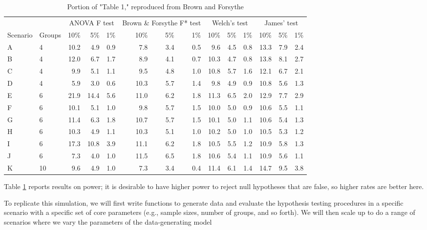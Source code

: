 \documentclass[
]{book}
\begin{document}
\begin{table}
\centering
\caption{\label{tab:BF-table1}Portion of "Table 1," reproduced from Brown and Forsythe}
\centering
\begin{tabular}[t]{l|l|r|r|r|r|r|r|r|r|r|r|r|r}
\hline
\multicolumn{2}{c|}{ } & \multicolumn{3}{c|}{ANOVA F test} & \multicolumn{3}{c|}{Brown \& Forsythe F* test} & \multicolumn{3}{c|}{Welch's test} & \multicolumn{3}{c}{James' test} \\
\cline{3-5} \cline{6-8} \cline{9-11} \cline{12-14}
Scenario & Groups & 10\% & 5\% & 1\% & 10\% & 5\% & 1\% & 10\% & 5\% & 1\% & 10\% & 5\% & 1\%\\
\hline
A & 4 & 10.2 & 4.9 & 0.9 & 7.8 & 3.4 & 0.5 & 9.6 & 4.5 & 0.8 & 13.3 & 7.9 & 2.4\\
\hline
B & 4 & 12.0 & 6.7 & 1.7 & 8.9 & 4.1 & 0.7 & 10.3 & 4.7 & 0.8 & 13.8 & 8.1 & 2.7\\
\hline
C & 4 & 9.9 & 5.1 & 1.1 & 9.5 & 4.8 & 1.0 & 10.8 & 5.7 & 1.6 & 12.1 & 6.7 & 2.1\\
\hline
D & 4 & 5.9 & 3.0 & 0.6 & 10.3 & 5.7 & 1.4 & 9.8 & 4.9 & 0.9 & 10.8 & 5.6 & 1.3\\
\hline
E & 6 & 21.9 & 14.4 & 5.6 & 11.0 & 6.2 & 1.8 & 11.3 & 6.5 & 2.0 & 12.9 & 7.7 & 2.9\\
\hline
F & 6 & 10.1 & 5.1 & 1.0 & 9.8 & 5.7 & 1.5 & 10.0 & 5.0 & 0.9 & 10.6 & 5.5 & 1.1\\
\hline
G & 6 & 11.4 & 6.3 & 1.8 & 10.7 & 5.7 & 1.5 & 10.1 & 5.0 & 1.1 & 10.6 & 5.4 & 1.3\\
\hline
H & 6 & 10.3 & 4.9 & 1.1 & 10.3 & 5.1 & 1.0 & 10.2 & 5.0 & 1.0 & 10.5 & 5.3 & 1.2\\
\hline
I & 6 & 17.3 & 10.8 & 3.9 & 11.1 & 6.2 & 1.8 & 10.5 & 5.5 & 1.2 & 10.9 & 5.8 & 1.3\\
\hline
J & 6 & 7.3 & 4.0 & 1.0 & 11.5 & 6.5 & 1.8 & 10.6 & 5.4 & 1.1 & 10.9 & 5.6 & 1.1\\
\hline
K & 10 & 9.6 & 4.9 & 1.0 & 7.3 & 3.4 & 0.4 & 11.4 & 6.1 & 1.4 & 14.7 & 9.5 & 3.8\\
\hline
\end{tabular}
\end{table}

Table \ref{tab:BF-table1} reports results on power; it is desirable to have higher power to reject null hypotheses that are false, so higher rates are better here.

To replicate this simulation, we will first write functions to generate data and evaluate the hypothesis testing procedures in a specific scenario with a specific set of core parameters (e.g., sample sizes, number of groups, and so forth). We will then scale up to do a range of scenarios where we vary the parameters of the data-generating model
\end{document}
